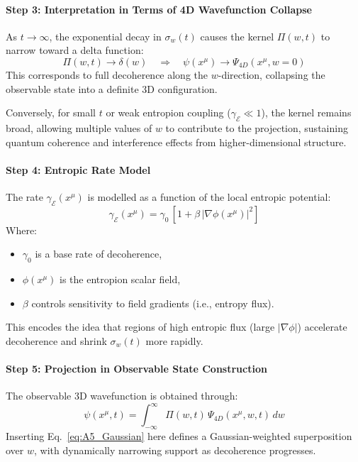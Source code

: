 \documentclass[12pt]{article}
\begin{document}
\paragraph{Step 3: Interpretation in Terms of 4D Wavefunction Collapse}

As \(t \to \infty\), the exponential decay in \(\sigma_w(t)\) causes the kernel \(\Pi(w, t)\) to narrow toward a delta function:
\begin{equation}
\Pi(w, t) \to \delta(w)
\quad \Rightarrow \quad
\psi(x^\mu) \to \Psi_{4D}(x^\mu, w=0)
\end{equation}
This corresponds to full decoherence along the \(w\)-direction, collapsing the observable state into a definite 3D configuration.

Conversely, for small \(t\) or weak entropion coupling (\(\gamma_\mathcal{E} \ll 1\)), the kernel remains broad, allowing multiple values of \(w\) to contribute to the projection, sustaining quantum coherence and interference effects from higher-dimensional structure.

\paragraph{Step 4: Entropic Rate Model}

The rate \(\gamma_\mathcal{E}(x^\mu)\) is modelled as a function of the local entropic potential:
\begin{equation}
\gamma_\mathcal{E}(x^\mu) = \gamma_0\, \left[1 + \beta\, |\nabla \phi(x^\mu)|^2 \right]
\label{eq:A5_GammaRate}
\end{equation}
Where:
\begin{itemize}
  \item \(\gamma_0\) is a base rate of decoherence,
  \item \(\phi(x^\mu)\) is the entropion scalar field,
  \item \(\beta\) controls sensitivity to field gradients (i.e., entropy flux).
\end{itemize}

This encodes the idea that regions of high entropic flux (large \(|\nabla \phi|\)) accelerate decoherence and shrink \(\sigma_w(t)\) more rapidly.

\paragraph{Step 5: Projection in Observable State Construction}

The observable 3D wavefunction is obtained through:
\begin{equation}
\psi(x^\mu, t) = \int_{-\infty}^{\infty} \Pi(w, t)\, \Psi_{4D}(x^\mu, w, t)\, dw
\label{eq:A5_ProjectedWavefunction}
\end{equation}
Inserting Eq.~\eqref{eq:A5_Gaussian} here defines a Gaussian-weighted superposition over \(w\), with dynamically narrowing support as decoherence progresses.
\end{document}
